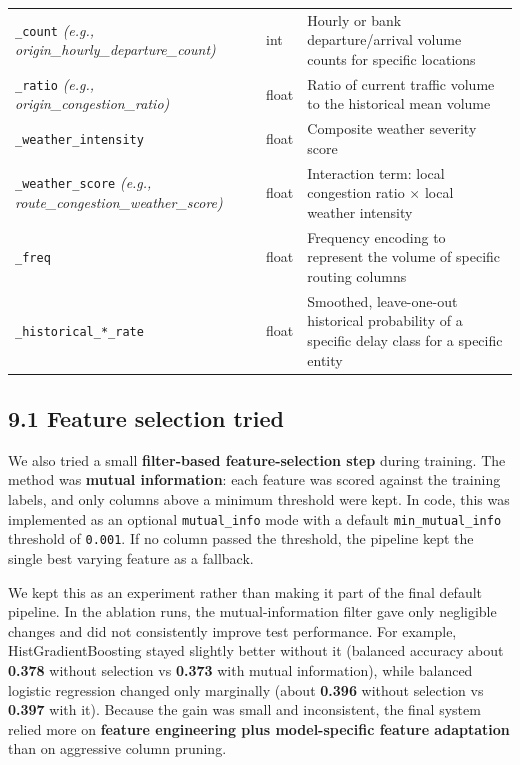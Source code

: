 \documentclass{article}
\newcommand{\code}[1]{\texttt{\small #1}}
\begin{document}
\begin{tcolorbox}[mainbox, title={Engineered Features}]
\begin{longtable}{L{6cm} L{1.5cm} p{6cm}}
    \code{*\_count} \newline \textit{(e.g., origin\_hourly\_departure\_count)} & int & Hourly or bank departure/arrival volume counts for specific locations \\
    \code{*\_ratio} \newline \textit{(e.g., origin\_congestion\_ratio)} & float & Ratio of current traffic volume to the historical mean volume \\

    \code{*\_weather\_intensity} & float & Composite weather severity score \\
    \code{*\_weather\_score} \newline \textit{(e.g., route\_congestion\_weather\_score)} & float & Interaction term: local congestion ratio $\times$ local weather intensity \\

    \code{*\_freq} & float & Frequency encoding to represent the volume of specific routing columns \\
    \code{*\_historical\_*\_rate} \newline \textit{} & float & Smoothed, leave-one-out historical probability of a specific delay class for a specific entity \\
    \bottomrule
\end{longtable}
\end{tcolorbox}

\subsection*{\textcolor{accentgold}{9.1 Feature selection tried}} 

We also tried a small \textbf{filter-based feature-selection step} during training. The method was \textbf{mutual information}: each feature was scored against the training labels, and only columns above a minimum threshold were kept. In code, this was implemented as an optional \code{mutual\_info} mode with a default \code{min\_mutual\_info} threshold of \code{0.001}. If no column passed the threshold, the pipeline kept the single best varying feature as a fallback.

We kept this as an experiment rather than making it part of the final default pipeline. In the ablation runs, the mutual-information filter gave only negligible changes and did not consistently improve test performance. For example, HistGradientBoosting stayed slightly better without it (balanced accuracy about \textbf{0.378} without selection vs \textbf{0.373} with mutual information), while balanced logistic regression changed only marginally (about \textbf{0.396} without selection vs \textbf{0.397} with it). Because the gain was small and inconsistent, the final system relied more on \textbf{feature engineering plus model-specific feature adaptation} than on aggressive column pruning.
\end{document}
